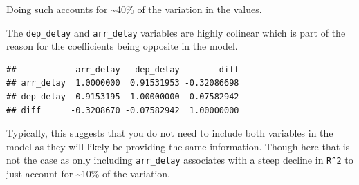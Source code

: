 \documentclass[]{book}
\newenvironment{Shaded}{\begin{snugshade}}{\end{snugshade}}
\newcommand{\DataTypeTok}[1]{\textcolor[rgb]{0.13,0.29,0.53}{#1}}
\newcommand{\KeywordTok}[1]{\textcolor[rgb]{0.13,0.29,0.53}{\textbf{#1}}}
\newcommand{\NormalTok}[1]{#1}
\newcommand{\OperatorTok}[1]{\textcolor[rgb]{0.81,0.36,0.00}{\textbf{#1}}}
\newcommand{\StringTok}[1]{\textcolor[rgb]{0.31,0.60,0.02}{#1}}
\theoremstyle{definition}
\theoremstyle{definition}
\theoremstyle{definition}
\theoremstyle{remark}
\begin{document}
Doing such accounts for \textasciitilde{}40\% of the variation in the
values.

The \texttt{dep\_delay} and \texttt{arr\_delay} variables are highly
colinear which is part of the reason for the coefficients being opposite
in the model.

\begin{Shaded}
\end{Shaded}

\begin{verbatim}
##            arr_delay   dep_delay        diff
## arr_delay  1.0000000  0.91531953 -0.32086698
## dep_delay  0.9153195  1.00000000 -0.07582942
## diff      -0.3208670 -0.07582942  1.00000000
\end{verbatim}

Typically, this suggests that you do not need to include both variables
in the model as they will likely be providing the same information.
Though here that is not the case as only including \texttt{arr\_delay}
associates with a steep decline in \texttt{R\^{}2} to just account for
\textasciitilde{}10\% of the variation.

\begin{Shaded}
\end{Shaded}
\end{document}
